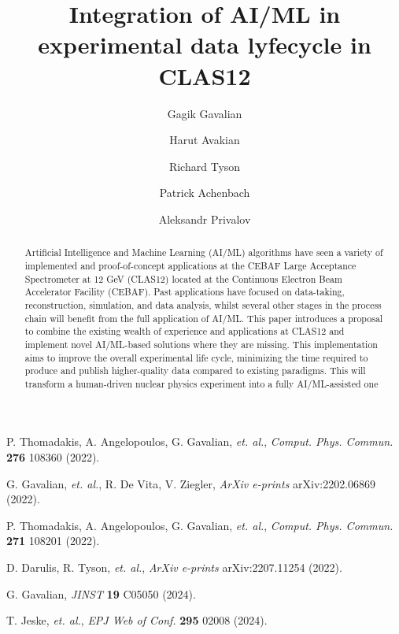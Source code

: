 \documentclass[11pt,titlepage]{article}
\title{Integration of AI/ML in experimental data lyfecycle in CLAS12}
\author{Gagik Gavalian}
\author{Harut Avakian}
\author{Richard Tyson}
\author{Patrick Achenbach}
\affil{Jefferson Lab, Newport News, VA, USA}
\author{Aleksandr Privalov}
\affil{NIIChaVo}
\begin{document}

\maketitle

\begin{abstract}
    Artificial Intelligence and Machine Learning (AI/ML) algorithms have seen a variety of implemented 
    and proof-of-concept applications at the CEBAF Large Acceptance Spectrometer at 12 GeV (CLAS12) located 
    at the Continuous Electron Beam Accelerator Facility (CEBAF). Past applications have focused on data-taking, 
    reconstruction, simulation, and data analysis, whilst several other stages in the process chain will benefit 
    from the full application of AI/ML. This paper introduces a proposal to combine the existing 
    wealth of experience and applications at CLAS12 and implement novel AI/ML-based solutions where they are missing. 
    This implementation aims to improve the overall experimental life cycle, minimizing the time required to produce and 
    publish higher-quality data compared to existing paradigms. This will transform a human-driven nuclear 
    physics experiment into a fully AI/ML-assisted one
\end{abstract}











%
%




\begin{thebibliography}{00}
P. Thomadakis, A. Angelopoulos, G. Gavalian, \emph{et. al.}, \emph{Comput. Phys. Commun.} \textbf{276} 108360 (2022).

G. Gavalian, \emph{et. al.}, R. De Vita, V. Ziegler, \emph{ArXiv e-prints} arXiv:2202.06869 (2022).

P. Thomadakis, A. Angelopoulos, G. Gavalian, \emph{et. al.}, \emph{Comput. Phys. Commun.} \textbf{271} 108201 (2022).

D. Darulis, R. Tyson, \emph{et. al.}, \emph{ArXiv e-prints} arXiv:2207.11254 (2022).

G. Gavalian, \emph{JINST} \textbf{19} C05050 (2024).

T. Jeske, \emph{et. al.}, \emph{EPJ Web of Conf.} \textbf{295} 02008 (2024).

\end{thebibliography}

%
%
\end{document}

